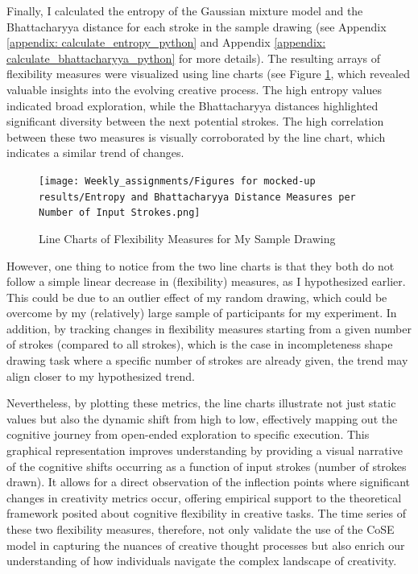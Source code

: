 \documentclass[../Proposal.tex]{subfiles}
\begin{document}
Finally, I calculated the entropy of the Gaussian mixture model and the Bhattacharyya distance for each stroke in the sample drawing (see Appendix \ref{appendix: calculate_entropy_python} and Appendix \ref{appendix: calculate_bhattacharyya_python} for more details). The resulting arrays of flexibility measures were visualized using line charts (see Figure \ref{fig: Line Charts of Flexibility Measures for My Sample Drawing}, which revealed valuable insights into the evolving creative process. The high entropy values indicated broad exploration, while the Bhattacharyya distances highlighted significant diversity between the next potential strokes. The high correlation between these two measures is visually corroborated by the line chart, which indicates a similar trend of changes. 

\begin{figure}[htbp]
    \centering
    \texttt{[image: Weekly\_assignments/Figures for mocked-up results/Entropy and Bhattacharyya Distance Measures per Number of Input Strokes.png]}
    \caption{Line Charts of Flexibility Measures for My Sample Drawing}
    \label{fig: Line Charts of Flexibility Measures for My Sample Drawing}
\end{figure}

However, one thing to notice from the two line charts is that they both do not follow a simple linear decrease in (flexibility) measures, as I hypothesized earlier. This could be due to an outlier effect of my random drawing, which could be overcome by my (relatively) large sample of participants for my experiment. In addition, by tracking changes in flexibility measures starting from a given number of strokes (compared to all strokes), which is the case in incompleteness shape drawing task where a specific number of strokes are already given, the trend may align closer to my hypothesized trend.

Nevertheless, by plotting these metrics, the line charts illustrate not just static values but also the dynamic shift from high to low, effectively mapping out the cognitive journey from open-ended exploration to specific execution. This graphical representation improves understanding by providing a visual narrative of the cognitive shifts occurring as a function of input strokes (number of strokes drawn). It allows for a direct observation of the inflection points where significant changes in creativity metrics occur, offering empirical support to the theoretical framework posited about cognitive flexibility in creative tasks. The time series of these two flexibility measures, therefore, not only validate the use of the CoSE model in capturing the nuances of creative thought processes but also enrich our understanding of how individuals navigate the complex landscape of creativity.
\end{document}
